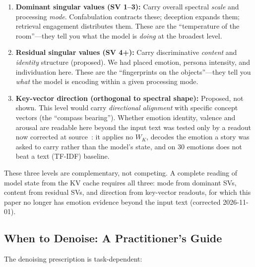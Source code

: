 \documentclass[11pt,a4paper]{article}
\begin{document}
\begin{enumerate}[nosep]
    \item \textbf{Dominant singular values (SV 1--3):} Carry overall spectral
    \emph{scale} and processing \emph{mode}. Confabulation contracts these;
    deception expands them; retrieval engagement distributes them. These are
    the ``temperature of the room''---they tell you what the model is
    \emph{doing} at the broadest level.

    \item \textbf{Residual singular values (SV 4+):} Carry discriminative
    \emph{content} and \emph{identity} structure (proposed). We had placed
    emotion, persona intensity, and individuation here. These are the ``fingerprints on the
    objects''---they tell you \emph{what} the model is encoding within a given
    processing mode.

    \item \textbf{Key-vector direction (orthogonal to spectral shape):}
    Proposed, not shown. This level would carry \emph{directional
    alignment} with specific concept vectors (the ``compass bearing'').
    Whether emotion identity, valence and arousal are readable here beyond
    the input text was tested only by a readout now
    corrected at source~\citep{lyra_p4}: it applies no $W_K$, decodes the emotion a story was asked
    to carry rather than the model's state, and on 30 emotions does not beat
    a text (TF-IDF) baseline.
\end{enumerate}

These three levels are complementary, not competing. A complete reading of
model state from the KV cache requires all three: mode from dominant SVs,
content from residual SVs, and direction from key-vector readouts, for
which this paper no longer has emotion evidence beyond the input text
(corrected 2026-11-01).

\subsection{When to Denoise: A Practitioner's Guide}
\label{sec:when_denoise}

The denoising prescription is task-dependent:
\end{document}
